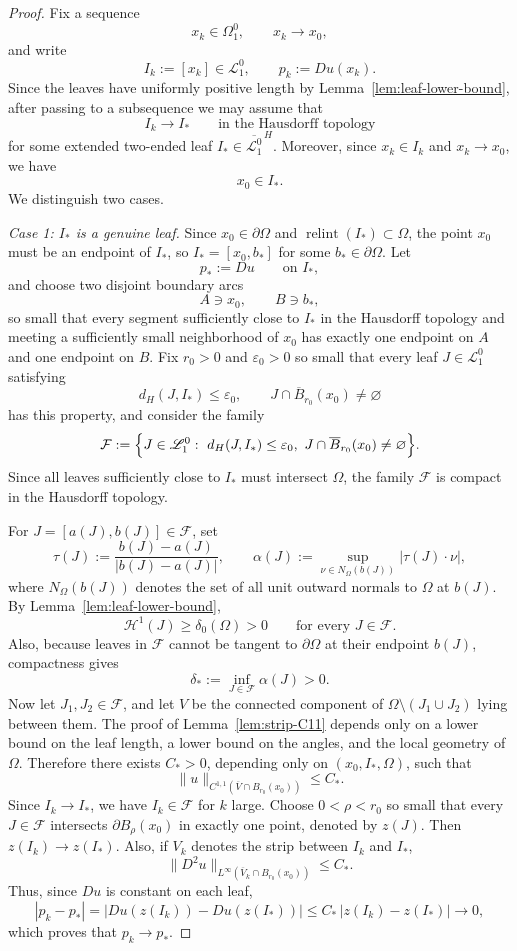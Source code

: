 \documentclass[reqno,11pt]{amsart}
\numberwithin{equation}{section}
\theoremstyle{remark}
\begin{document}
\begin{proof}
Fix a sequence
\[
x_k\in \Omega_1^0,
\qquad
x_k\to x_0,
\]
and write
\[
I_k:=[x_k]\in \mathscr L_1^0,
\qquad
p_k:=Du(x_k).
\]
Since the leaves have uniformly positive length by
Lemma~\ref{lem:leaf-lower-bound}, after passing to a subsequence we may assume
that
\[
I_k\to I_*
\qquad\text{in the Hausdorff topology}
\]
for some extended two-ended leaf \(I_*\in \overline{\mathscr L_1^0}^{\,H}\).
Moreover, since \(x_k\in I_k\) and \(x_k\to x_0\), we have
\[
x_0\in I_*.
\]
We distinguish two cases.

\smallskip
\noindent\emph{Case 1: \(I_*\) is a genuine leaf.}
Since \(x_0\in \partial\Omega\) and \(\operatorname{relint}(I_*)\subset \Omega\),
the point \(x_0\) must be an endpoint of \(I_*\), so \(I_*=[x_0,b_*]\) for some \(b_*\in \partial \Omega\).
Let
\[
p_*:=Du\qquad\text{on }I_*,
\]
and choose two disjoint boundary arcs
\[
A\ni x_0,
\qquad
B\ni b_*,
\]
so small that every segment sufficiently close to \(I_*\) in the Hausdorff
topology and meeting a sufficiently small neighborhood of \(x_0\) has exactly
one endpoint on \(A\) and one endpoint on \(B\). Fix \(r_0>0\) and
\(\varepsilon_0>0\) so small that every leaf \(J\in \mathscr L_1^0\) satisfying
\[
d_H(J,I_*)\le \varepsilon_0,
\qquad
J\cap \overline B_{r_0}(x_0)\neq\varnothing
\]
has this property, and consider the family
\[
\mathcal F:=
\Bigl\{J\in \mathscr L_1^0:\ d_H(J,I_*)\le \varepsilon_0,\ 
J\cap \overline B_{r_0}(x_0)\neq\varnothing\Bigr\}.
\]
Since all leaves sufficiently close to \(I_*\) must intersect \(\Omega\), the family \(\mathcal F\) is compact in the Hausdorff topology.

For \(J=[a(J),b(J)]\in \mathcal F\), set
\[
\tau(J):=\frac{b(J)-a(J)}{|b(J)-a(J)|},
\qquad
\alpha(J):=\sup_{\nu\in N_\Omega(b(J))} |\tau(J)\cdot \nu|,
\]
where \(N_\Omega(b(J))\) denotes the set of all unit outward normals to \(\Omega\) at \(b(J)\).
By Lemma~\ref{lem:leaf-lower-bound},
\[
\mathscr H^1(J)\ge \delta_0(\Omega)>0
\qquad\text{for every }J\in \mathcal F.
\]
Also, because leaves in \(\mathcal F\) cannot be tangent to \(\partial\Omega\) at
their endpoint \(b(J)\), compactness gives
\[
\delta_*:=\inf_{J\in \mathcal F}\alpha(J)>0.
\]
Now let \(J_1,J_2\in \mathcal F\), and let \(V\) be the connected component of
\(\Omega\setminus (J_1\cup J_2)\) lying between them. The proof of
Lemma~\ref{lem:strip-C11} depends only on a lower bound on the leaf length, a lower bound on the angles, and the local geometry of \(\Omega\). Therefore there exists \(C_*>0\), depending only on \((x_0,I_*,\Omega)\), such that
\[
\|u\|_{C^{1,1}(\overline V\cap B_{r_0}(x_0))}\le C_*.
\]
Since \(I_k\to I_*\), we have \(I_k\in\mathcal F\) for \(k\) large. Choose
\(0<\rho<r_0\) so small that every \(J\in \mathcal F\) intersects
\(\partial B_\rho(x_0)\) in exactly one point, denoted by \(z(J)\).
Then \(z(I_k)\to z(I_*)\). Also, if \(V_k\) denotes the strip between \(I_k\) and \(I_*\),
\[
\|D^2u\|_{L^\infty(\overline V_k\cap B_{r_0}(x_0))}\le C_*.
\]
Thus, since \(Du\) is constant on each leaf,
\[
|p_k-p_*|
=
|Du(z(I_k))-Du(z(I_*))|
\le C_*\,|z(I_k)-z(I_*)|
\to 0,
\]
which proves that \(p_k\to p_*\).


\end{proof}
\end{document}
